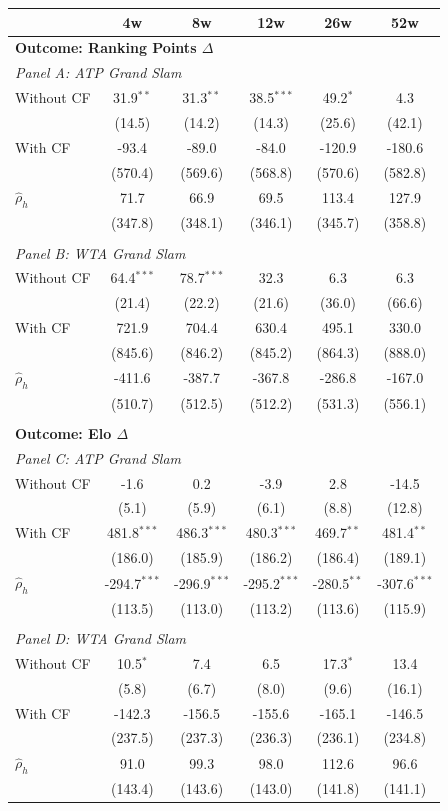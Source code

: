 \begin{tabular}{l*{5}{c}}
\toprule
 & 4w & 8w & 12w & 26w & 52w \\
\midrule
\multicolumn{6}{l}{\textbf{Outcome: Ranking Points $\Delta$}} \\[0.3em]
\multicolumn{6}{l}{\textit{Panel A: ATP Grand Slam}} \\
\midrule
Without CF & 31.9$^{**}$ & 31.3$^{**}$ & 38.5$^{***}$ & 49.2$^{*}$ & 4.3 \\
 & (14.5) & (14.2) & (14.3) & (25.6) & (42.1) \\
With CF & -93.4 & -89.0 & -84.0 & -120.9 & -180.6 \\
 & (570.4) & (569.6) & (568.8) & (570.6) & (582.8) \\
$\hat{\rho}_h$ & 71.7 & 66.9 & 69.5 & 113.4 & 127.9 \\
 & (347.8) & (348.1) & (346.1) & (345.7) & (358.8) \\
\\[0.5em]
\multicolumn{6}{l}{\textit{Panel B: WTA Grand Slam}} \\
\midrule
Without CF & 64.4$^{***}$ & 78.7$^{***}$ & 32.3 & 6.3 & 6.3 \\
 & (21.4) & (22.2) & (21.6) & (36.0) & (66.6) \\
With CF & 721.9 & 704.4 & 630.4 & 495.1 & 330.0 \\
 & (845.6) & (846.2) & (845.2) & (864.3) & (888.0) \\
$\hat{\rho}_h$ & -411.6 & -387.7 & -367.8 & -286.8 & -167.0 \\
 & (510.7) & (512.5) & (512.2) & (531.3) & (556.1) \\
\\[0.5em]
\multicolumn{6}{l}{\textbf{Outcome: Elo $\Delta$}} \\[0.3em]
\multicolumn{6}{l}{\textit{Panel C: ATP Grand Slam}} \\
\midrule
Without CF & -1.6 & 0.2 & -3.9 & 2.8 & -14.5 \\
 & (5.1) & (5.9) & (6.1) & (8.8) & (12.8) \\
With CF & 481.8$^{***}$ & 486.3$^{***}$ & 480.3$^{***}$ & 469.7$^{**}$ & 481.4$^{**}$ \\
 & (186.0) & (185.9) & (186.2) & (186.4) & (189.1) \\
$\hat{\rho}_h$ & -294.7$^{***}$ & -296.9$^{***}$ & -295.2$^{***}$ & -280.5$^{**}$ & -307.6$^{***}$ \\
 & (113.5) & (113.0) & (113.2) & (113.6) & (115.9) \\
\\[0.5em]
\multicolumn{6}{l}{\textit{Panel D: WTA Grand Slam}} \\
\midrule
Without CF & 10.5$^{*}$ & 7.4 & 6.5 & 17.3$^{*}$ & 13.4 \\
 & (5.8) & (6.7) & (8.0) & (9.6) & (16.1) \\
With CF & -142.3 & -156.5 & -155.6 & -165.1 & -146.5 \\
 & (237.5) & (237.3) & (236.3) & (236.1) & (234.8) \\
$\hat{\rho}_h$ & 91.0 & 99.3 & 98.0 & 112.6 & 96.6 \\
 & (143.4) & (143.6) & (143.0) & (141.8) & (141.1) \\
\bottomrule
\end{tabular}

